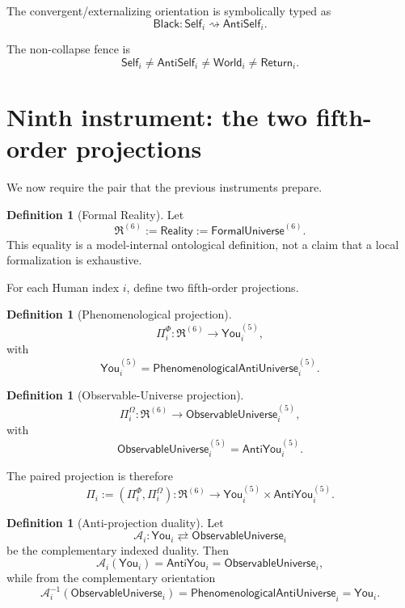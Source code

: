 \documentclass[10pt]{article}
\theoremstyle{pe}
\theoremstyle{definition}
\newtheorem{definition}[theorem]{Definition}
\newcommand{\World}{\mathsf{World}}
\newcommand{\Return}{\mathsf{Return}}
\newcommand{\Reality}{\mathsf{Reality}}
\newcommand{\FormalUniverse}{\mathsf{FormalUniverse}}
\newcommand{\Self}{\mathsf{Self}}
\newcommand{\AntiSelf}{\mathsf{AntiSelf}}
\newcommand{\You}{\mathsf{You}}
\newcommand{\AntiYou}{\mathsf{AntiYou}}
\newcommand{\ObsU}{\mathsf{ObservableUniverse}}
\newcommand{\PhenAntiU}{\mathsf{PhenomenologicalAntiUniverse}}
\newcommand{\Black}{\mathsf{Black}}
\begin{document}
The convergent/externalizing orientation is symbolically typed as
\[
  \boxed{
  \Black:
  \Self_i
  \rightsquigarrow
  \AntiSelf_i.
  }
\]

The non-collapse fence is
\[
  \boxed{
  \Self_i
  \neq
  \AntiSelf_i
  \neq
  \World_i
  \neq
  \Return_i.
  }
\]

\section{Ninth instrument: the two fifth-order projections}

We now require the pair that the previous instruments prepare.

\begin{definition}[Formal Reality]
Let
\begin{equation}\label{eq:reality-def}
  \boxed{
  \mathfrak R^{(6)}
  :=
  \Reality
  :=
  \FormalUniverse^{(6)}.
  }
\end{equation}
This equality is a model-internal ontological definition, not a claim that a local formalization is exhaustive.
\end{definition}

For each Human index \(i\), define two fifth-order projections.

\begin{definition}[Phenomenological projection]
\[
  \Pi_i^{\Phi}:
  \mathfrak R^{(6)}
  \longrightarrow
  \You_i^{(5)},
\]
with
\begin{equation}\label{eq:you-projection}
  \boxed{
  \You_i^{(5)}
  =
  \PhenAntiU_i^{(5)}.
  }
\end{equation}
\end{definition}

\begin{definition}[Observable-Universe projection]
\[
  \Pi_i^{\Omega}:
  \mathfrak R^{(6)}
  \longrightarrow
  \ObsU_i^{(5)},
\]
with
\begin{equation}\label{eq:anti-you-projection}
  \boxed{
  \ObsU_i^{(5)}
  =
  \AntiYou_i^{(5)}.
  }
\end{equation}
\end{definition}

The paired projection is therefore
\begin{equation}\label{eq:paired-projection}
  \boxed{
  \Pi_i
  :=
  (\Pi_i^{\Phi},\Pi_i^{\Omega})
  :
  \mathfrak R^{(6)}
  \longrightarrow
  \You_i^{(5)}\times\AntiYou_i^{(5)}.
  }
\end{equation}

\begin{definition}[Anti-projection duality]
Let
\[
  \mathcal A_i:
  \You_i
  \rightleftarrows
  \ObsU_i
\]
be the complementary indexed duality.  Then
\[
  \mathcal A_i(\You_i)
  =
  \AntiYou_i
  =
  \ObsU_i,
\]
while from the complementary orientation
\[
  \mathcal A_i^{-1}(\ObsU_i)
  =
  \PhenAntiU_i
  =
  \You_i.
\]
\end{definition}
\end{document}
